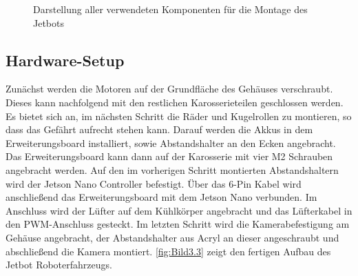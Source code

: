 \begin{figure}[H]
    \centering
    \caption[Komponenten Jetbot]{Darstellung aller verwendeten Komponenten für die Montage des Jetbots}
    \label{fig:Bild3.2}
\end{figure}

\subsection{Hardware-Setup}

Zunächst werden die Motoren auf der Grundfläche des Gehäuses verschraubt. Dieses kann nachfolgend mit den restlichen Karosserieteilen geschlossen werden. Es bietet sich an, im nächsten Schritt die Räder und Kugelrollen zu montieren, so dass das Gefährt aufrecht stehen kann. Darauf werden die Akkus in dem Erweiterungsboard installiert, sowie Abstandshalter an den Ecken angebracht. Das Erweiterungsboard kann dann auf der Karosserie mit vier M2 Schrauben angebracht werden. Auf den im vorherigen Schritt montierten Abstandshaltern wird der Jetson Nano Controller befestigt. Über das 6-Pin Kabel wird anschließend das Erweiterungsboard mit dem Jetson Nano verbunden. Im Anschluss wird der Lüfter auf dem Kühlkörper angebracht und das Lüfterkabel in den PWM-Anschluss gesteckt. Im letzten Schritt wird die Kamerabefestigung am Gehäuse angebracht, der Abstandshalter aus Acryl an dieser angeschraubt und abschließend die Kamera montiert. \autoref{fig:Bild3.3} zeigt den fertigen Aufbau des Jetbot Roboterfahrzeugs.

